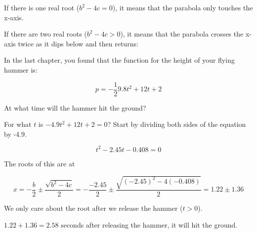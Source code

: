 If there is one real root ($b^2 - 4c = 0$), it means that the parabola only touches the x-axis.
\begin{center}
  
\end{center}

If there are two real roots ($b^2 - 4c > 0$), it means that the parabola crosses the x-axis twice as it dips below and then returns:
\begin{center}
  
  
\end{center}
\begin{Exercise}[title={Roots of a Quadratic}, label=solve_quadratic]

  In the last chapter, you found that the function for the height of your flying hammer is:

  $$p = -\frac{1}{2}9.8 t^2 + 12t + 2$$

  At what time will the hammer hit the ground?

  
\end{Exercise}
\begin{Answer}[ref=solve_quadratic]

  For what $t$ is  $-4.9 t^2 + 12t + 2 = 0$?  Start by dividing both sides of the equation by -4.9.

  $$t^2 - 2.45 t - 0.408 = 0$$

  The roots of this are at

  $$x = -\frac{b}{2} \pm \frac{\sqrt{b^2 - 4c}}{2} = -\frac{-2.45}{2} \pm \frac{\sqrt{(-2.45)^2 - 4(-0.408)}}{2} = 1.22 \pm 1.36$$

  We only care about the root after we release the hammer ($t > 0$).

  $1.22 + 1.36 = 2.58$ seconds after releasing the hammer, it will hit the ground.

  
\end{Answer}


